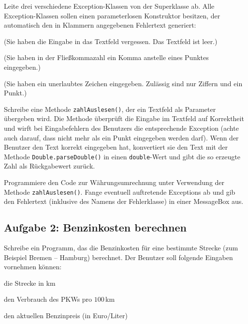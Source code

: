 \begin{compactenum}[a)]
\item Leite drei verschiedene Exception-Klassen von der Superklasse
 ab. Alle Exception-Klassen sollen einen parameterlosen
Konstruktor besitzen, der automatisch den in Klammern angegebenen Fehlertext generiert:

\begin{compactitem}
\item {} (\glqq Sie haben die Eingabe in das Textfeld
vergessen. Das Textfeld ist leer.\grqq ) 
\item {} (\glqq Sie haben in der Fließkommazahl ein Komma
anstelle eines Punktes eingegeben.\grqq )
\item {} (\glqq Sie haben ein unerlaubtes Zeichen
eingegeben. Zulässig sind nur Ziffern und ein Punkt.\grqq )
\end{compactitem}

\item Schreibe eine Methode \lstinline|zahlAuslesen()|, der ein Textfeld als
Parameter übergeben wird. Die Methode überprüft die Eingabe im Textfeld auf
Korrektheit und wirft bei Eingabefehlern des Benutzers die entsprechende
Exception (achte auch darauf, dass nicht mehr als ein Punkt eingegeben werden
darf). Wenn der Benutzer den Text korrekt eingegeben hat, konvertiert sie
den Text mit der Methode \lstinline|Double.parseDouble()| in einen
\lstinline|double|-Wert und gibt die so erzeugte Zahl als Rückgabewert zurück.

\item Programmiere den Code zur Währungsumrechnung unter Verwendung der
Methode \lstinline|zahlAuslesen()|. Fange eventuell auftretende Exceptions ab
und gib den Fehlertext (inklusive des Namens der Fehlerklasse) in einer
MessageBox aus.
\end{compactenum}


\subsection{Aufgabe 2: Benzinkosten berechnen}

Schreibe ein Programm, das die Benzinkosten für eine bestimmte Strecke (zum
Beispiel Bremen -- Hamburg) berechnet. Der Benutzer soll folgende Eingaben
vornehmen können:

\begin{compactitem}
\item die Strecke in km 
\item den Verbrauch des PKWs pro $100\,$km 
\item den aktuellen Benzinpreis (in Euro/Liter)
\end{compactitem}

